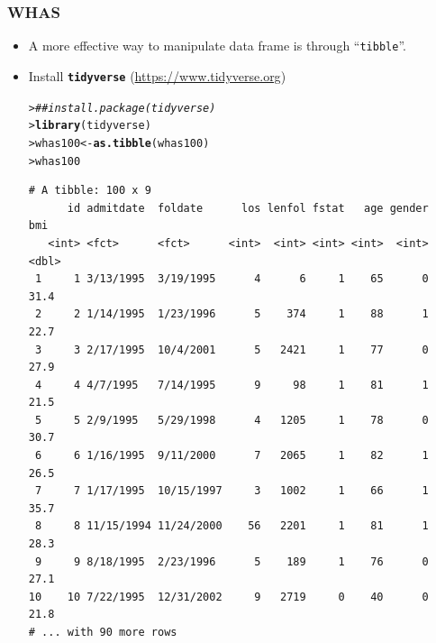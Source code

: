 \documentclass[10pt]{beamer}\usepackage[]{graphicx}\usepackage[]{color}
\makeatletter
\newcommand{\hlcom}[1]{\textcolor[rgb]{0.678,0.584,0.686}{\textit{#1}}}%
\newcommand{\hlstd}[1]{\textcolor[rgb]{0.345,0.345,0.345}{#1}}%
\newcommand{\hlkwb}[1]{\textcolor[rgb]{0.69,0.353,0.396}{#1}}%
\newcommand{\hlkwd}[1]{\textcolor[rgb]{0.737,0.353,0.396}{\textbf{#1}}}%
\newenvironment{kframe}{%
 \def\at@end@of@kframe{}%
 \ifinner\ifhmode%
  \def\at@end@of@kframe{\end{minipage}}%
  \begin{minipage}{\columnwidth}%
 \fi\fi%
 \def\FrameCommand##1{\hskip\@totalleftmargin \hskip-\fboxsep
 \colorbox{shadecolor}{##1}\hskip-\fboxsep
     \hskip-\linewidth \hskip-\@totalleftmargin \hskip\columnwidth}%
 \MakeFramed {\advance\hsize-\width
   \@totalleftmargin\z@ \linewidth\hsize
   \@setminipage}}%
 {\par\unskip\endMakeFramed%
 \at@end@of@kframe}
\newenvironment{knitrout}{}{} %
\renewenvironment{knitrout}{\setlength{\topsep}{-.2mm}}{}
\newcommand{\pkg}[1]{{\textbf{\texttt{#1}}}}
\makeatother
\begin{document}
\begin{frame}[fragile]
\frametitle{WHAS}
  \begin{itemize}
  \item A more effective way to manipulate data frame is through ``\texttt{tibble}''.
  \item Install \pkg{tidyverse} (\url{https://www.tidyverse.org})
\begin{knitrout}\scriptsize
{}\color{fgcolor}\begin{kframe}
\begin{alltt}
\hlstd{> }\hlcom{## install.package(tidyverse)}
\hlstd{> }\hlkwd{library}\hlstd{(tidyverse)}
\hlstd{> }\hlstd{whas100} \hlkwb{<-} \hlkwd{as.tibble}\hlstd{(whas100)}
\hlstd{> }\hlstd{whas100}
\end{alltt}
\begin{verbatim}
# A tibble: 100 x 9
      id admitdate  foldate      los lenfol fstat   age gender   bmi
   <int> <fct>      <fct>      <int>  <int> <int> <int>  <int> <dbl>
 1     1 3/13/1995  3/19/1995      4      6     1    65      0  31.4
 2     2 1/14/1995  1/23/1996      5    374     1    88      1  22.7
 3     3 2/17/1995  10/4/2001      5   2421     1    77      0  27.9
 4     4 4/7/1995   7/14/1995      9     98     1    81      1  21.5
 5     5 2/9/1995   5/29/1998      4   1205     1    78      0  30.7
 6     6 1/16/1995  9/11/2000      7   2065     1    82      1  26.5
 7     7 1/17/1995  10/15/1997     3   1002     1    66      1  35.7
 8     8 11/15/1994 11/24/2000    56   2201     1    81      1  28.3
 9     9 8/18/1995  2/23/1996      5    189     1    76      0  27.1
10    10 7/22/1995  12/31/2002     9   2719     0    40      0  21.8
# ... with 90 more rows
\end{verbatim}
\end{kframe}
\end{knitrout}
  \end{itemize}
\end{frame}
\end{document}
